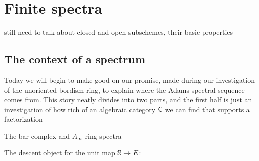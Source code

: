 
\chapter{Finite spectra}





still need to talk about closed and open subschemes, their basic properties


\section{The context of a spectrum}\label{StableContextLecture}

Today we will begin to make good on our promise, made during our investigation of the unoriented bordism ring, to explain where the Adams spectral sequence comes from.  This story neatly divides into two parts, and the first half is just an investigation of how rich of an algebraic category $\CatOf{C}$ we can find that supports a factorization










The bar complex and $A_\infty$ ring spectra

The descent object for the unit map $\S \to E$:

